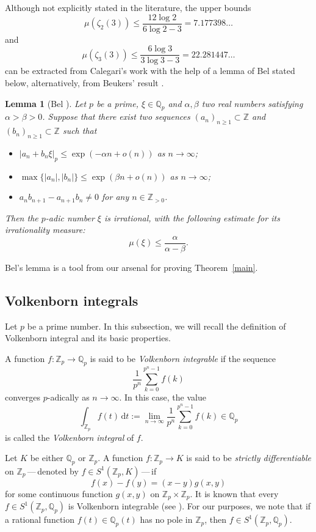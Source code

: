 \documentclass[12pt]{article}
\let\le\leqslant
\let\ge\geqslant
\renewcommand{\d}{\mathrm{d}}
\newtheorem{lemma}[theorem]{Lemma}
\theoremstyle{remark}
\numberwithin{equation}{section}
\begin{document}
Although not explicitly stated in the literature, the upper bounds
\[
\mu(\zeta_2(3)) \le \frac{12\log 2}{6 \log 2 - 3} = 7.177398\dots
\]
and
\[
\mu(\zeta_3(3)) \le \frac{6\log 3}{3\log 3 -3} = 22.281447\dots
\]
can be extracted from Calegari's work \cite{Cal2005} with the help of a lemma of Bel \cite{Bel2019} stated below, alternatively, from Beukers' result \cite[Theorem 11.2]{Beu2008}.

\begin{lemma}[{Bel \cite[Lemme 3.2]{Bel2019}}]
\label{lem_Bel}
Let $p$ be a prime, $\xi \in \mathbb{Q}_p$ and $\alpha, \beta$ two real numbers satisfying $\alpha > \beta > 0$. 
Suppose that there exist two sequences $(a_n)_{n \ge 1} \subset \mathbb{Z}$ and $(b_n)_{n \ge 1} \subset \mathbb{Z}$ such that
\begin{itemize}
	\item   $|a_n + b_n \xi|_p \le \exp(-\alpha n +o(n))$ as $n \to \infty$\textup;
	\item   $\max\{ |a_n|, |b_n| \} \le \exp(\beta n + o(n))$ as $n \to \infty$\textup;
	\item  $a_nb_{n+1} - a_{n+1}b_n \ne 0$ for any $n \in \mathbb{Z}_{>0}$.
\end{itemize}
Then the $p$-adic number $\xi$ is irrational, with the following estimate for its irrationality measure:
\[ 
\mu(\xi) \le \frac{\alpha}{\alpha - \beta}. 
\]
\end{lemma}

Bel's lemma is a tool from our arsenal for proving Theorem~\ref{main}.

\subsection{Volkenborn integrals}

Let $p$ be a prime number. 
In this subsection, we will recall the definition of Volkenborn integral \cite{Vol1972} and its basic properties.

A function $f\colon \mathbb{Z}_p \to \mathbb{Q}_p$ is said to be \emph{Volkenborn integrable} if the sequence
\[
\frac{1}{p^n} \sum_{k=0}^{p^n-1} f(k)
\]
converges $p$-adically as $n \to \infty$. 
In this case, the value
\[ 
\int_{\mathbb{Z}_p} f(t)\,\d t := \lim_{n \to \infty} \frac{1}{p^n} \sum_{k=0}^{p^n-1} f(k) \in \mathbb{Q}_p 
\]
is called the \emph{Volkenborn integral} of $f$. 

Let $K$ be either $\mathbb{Q}_p$ or $\mathbb{Z}_p$. 
A function $f\colon\mathbb{Z}_p \to K$ is said to be \emph{strictly differentiable} on $\mathbb{Z}_p$\,---\,denoted by $f \in S^{1}(\mathbb{Z}_p,K)$\,---\,if 
\[
f(x) - f(y) = (x-y) g(x,y)
\]
for some continuous function $g(x,y)$ on $\mathbb{Z}_p \times \mathbb{Z}_p$.
It is known that every $f \in S^{1}(\mathbb{Z}_p,\mathbb{Q}_p)$ is Volkenborn integrable (see \cite[p.~264]{Rob2000}).
For our purposes, we note that if a rational function $f(t) \in \mathbb{Q}_p(t)$ has no pole in $\mathbb{Z}_p$, then $f \in S^{1}(\mathbb{Z}_p,\mathbb{Q}_p)$.
\end{document}
